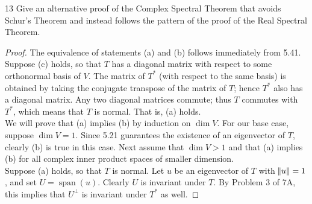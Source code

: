 \documentclass{extarticle}
\newenvironment{problem}[1]{\begin{prob*}{#1}{}}{\end{prob*}}
\DeclareMathOperator{\Span}{span}
\begin{document}
\begin{problem}{13}
Give an alternative proof of the Complex Spectral Theorem that avoids Schur's Theorem and instead follows the pattern of the proof of the Real Spectral Theorem.
\end{problem}
\begin{proof}
The equivalence of statements (a) and (b) follows immediately from 5.41. 
\indent Suppose (c) holds, so that $T$ has a diagonal matrix with respect to some orthonormal basis of $V$.  The matrix of $T^\ast$ (with respect to the same basis) is obtained by taking the conjugate transpose of the matrix of $T$; hence $T^\ast$ also has a diagonal matrix.  Any two diagonal matrices commute; thus $T$ commutes with $T^\ast$, which means that $T$ is normal.  That is, (a) holds.\\
\indent We will prove that (a) implies (b) by induction on $\dim V$.  For our base case, suppose $\dim V= 1$.  Since 5.21 guarantees the existence of an eigenvector of $T$, clearly (b) is true in this case.  Next assume that $\dim V > 1$ and that (a) implies (b) for all complex inner product spaces of smaller dimension.\\
\indent Suppose (a) holds, so that $T$ is normal.  Let $u$ be an eigenvector of $T$ with $\norm{u} = 1$, and set $U = \Span(u)$.  Clearly $U$ is invariant under $T$.  By Problem 3 of 7A, this implies that $U^\perp$ is invariant under $T^\ast$ as well.
\end{proof}
\end{document}
